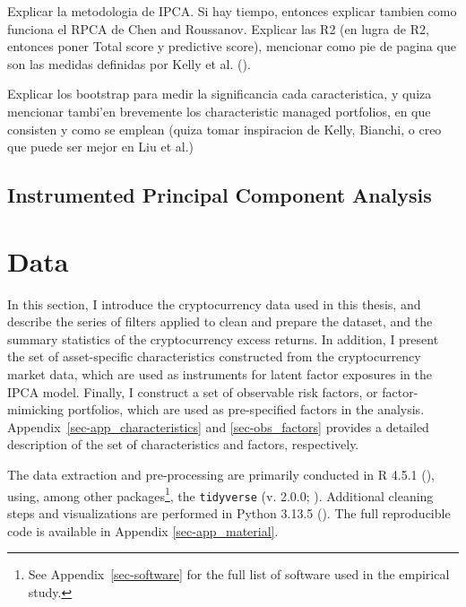 \documentclass[
  12pt,
  a4paper,
  openany]{scrbook}
\begin{document}
Explicar la metodologia de IPCA. Si hay tiempo, entonces explicar
tambien como funciona el RPCA de Chen and Roussanov. Explicar las R2 (en
lugra de R2, entonces poner Total score y predictive score), mencionar
como pie de pagina que son las medidas definidas por Kelly et al.
().

Explicar los bootstrap para medir la significancia cada caracteristica,
y quiza mencionar tambi'en brevemente los characteristic managed
portfolios, en que consisten y como se emplean (quiza tomar inspiracion
de Kelly, Bianchi, o creo que puede ser mejor en Liu et al.)

\section{Instrumented Principal Component
Analysis}\label{instrumented-principal-component-analysis}


\chapter{Data}\label{sec-data}

In this section, I introduce the cryptocurrency data used in this
thesis, and describe the series of filters applied to clean and prepare
the dataset, and the summary statistics of the cryptocurrency excess
returns. In addition, I present the set of asset-specific
characteristics constructed from the cryptocurrency market data, which
are used as instruments for latent factor exposures in the IPCA model.
Finally, I construct a set of observable risk factors, or
factor-mimicking portfolios, which are used as pre-specified factors in
the analysis. Appendix~\ref{sec-app_characteristics} and
\ref{sec-obs_factors} provides a detailed description of the set of
characteristics and factors, respectively.

The data extraction and pre-processing are primarily conducted in R
4.5.1 (), using, among other
packages\footnote{See Appendix~\ref{sec-software} for the full list of
  software used in the empirical study.}, the \texttt{tidyverse} (v.
2.0.0; ). Additional
cleaning steps and visualizations are performed in Python 3.13.5
(). The full
reproducible code is available in Appendix \ref{sec-app_material}.
\end{document}

